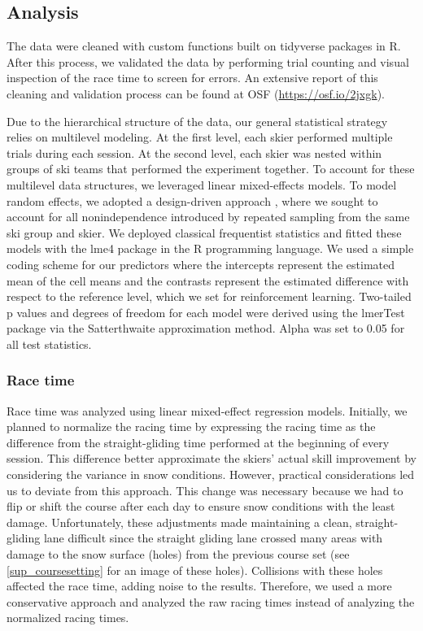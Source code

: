 \documentclass[pdflatex,sn-mathphys-num]{sn-jnl}%
\theoremstyle{thmstyleone}%
\theoremstyle{thmstyletwo}%
\theoremstyle{thmstylethree}%
\begin{document}
\subsection{Analysis}
The data were cleaned with custom functions built on tidyverse \cite{wickham_welcome_2019} packages in R. After this process, we validated the data by performing trial counting and visual inspection of the race time to screen for errors. An extensive report of this cleaning and validation process can be found at OSF  (\url{https://osf.io/2jxgk}).

Due to the hierarchical structure of the data, our general statistical strategy relies on multilevel modeling. At the first level, each skier performed multiple trials during each session. At the second level, each skier was nested within groups of ski teams that performed the experiment together. To account for these multilevel data structures, we leveraged linear mixed-effects models. To model random effects, we adopted a design-driven approach \cite{barr_random_2013, barr_learning_2021}, where we sought to account for all nonindependence introduced by repeated sampling from the same ski group and skier. We deployed classical frequentist statistics and fitted these models with the lme4 package \cite{bates_fitting_2015} in the R programming language. We used a simple coding scheme for our predictors where the intercepts represent the estimated mean of the cell means and the contrasts represent the estimated difference with respect to the reference level, which we set for reinforcement learning. Two-tailed p values and degrees of freedom for each model were derived using the lmerTest package \cite{kuznetsova_lmertest_2017} via the Satterthwaite approximation method. Alpha was set to 0.05 for all test statistics.

 \subsubsection{Race time}

Race time was analyzed using linear mixed-effect regression models. Initially, we planned to normalize the racing time by expressing the racing time as the difference from the straight-gliding time performed at the beginning of every session. This difference better approximate the skiers' actual skill improvement by considering the variance in snow conditions. However, practical considerations led us to deviate from this approach. This change was necessary because we had to flip or shift the course after each day to ensure snow conditions with the least damage. Unfortunately, these adjustments made maintaining a clean, straight-gliding lane difficult since the straight gliding lane crossed many areas with damage to the snow surface (holes) from the previous course set (see \ref{sup_coursesetting} for an image of these holes). Collisions with these holes affected the race time, adding noise to the results. Therefore, we used a more conservative approach and analyzed the raw racing times instead of analyzing the normalized racing times.
\end{document}
